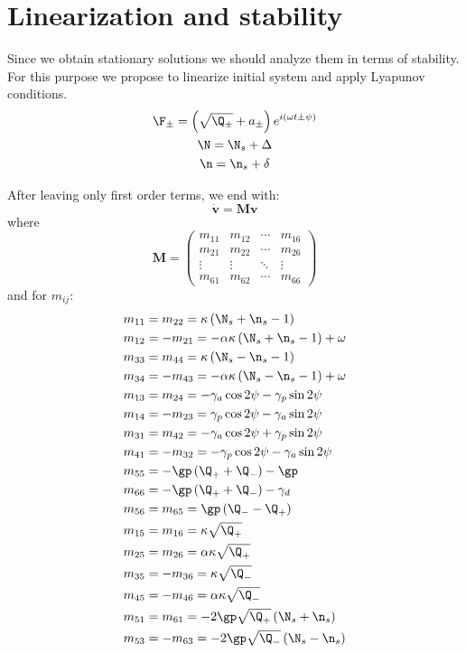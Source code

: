 \documentclass[12pt, notitlepage]{report}
\begin{document}
\section{Linearization and stability}
Since we obtain stationary solutions we should analyze them in terms of stability. For this purpose we propose to linearize initial system and apply Lyapunov conditions. 
\begin{gather}
	\F_\pm = \left(\sqrt{\Q_\pm}+a_\pm\right)e^{i(\omega t \pm \psi)} \\
	\N = \N_s + \Delta \\
	\n = \n_s + \delta
\end{gather}

After leaving only first order terms, we end with:
\newcommand{\bv}{\boldsymbol{v}}
\newcommand{\bM}{\boldsymbol{M}}
\begin{equation}
	\dot{\bv} = \bM\bv
\end{equation}
where
\begin{equation}
	\bM = \begin{pmatrix}
		m_{11} & m_{12} & \cdots & m_{16} \\
		m_{21} & m_{22} & \cdots &m_{26}\\
		\vdots & \vdots & \ddots & \vdots\\
		m_{61} & m_{62} & \cdots&  m_{66} 
	\end{pmatrix}
\end{equation}
and for $m_{ij}$:
\begin{align}
	m_{11} &= m_{22} = \kappa \left(\N_s + \n_s - 1\right)\\
	m_{12} &= -m_{21} = -\alpha\kappa\left(\N_s+\n_s-1\right) + \omega\\
	m_{33} &= m_{44} = \kappa \left(\N_s - \n_s - 1\right) \\
	m_{34} &= -m_{43} = - \alpha\kappa \left(\N_s - \n_s - 1\right) + \omega \\
	m_{13} &= m_{24} = -\gamma_a\cos2\psi - \gamma_p\sin2\psi \\
	m_{14} &= -m_{23} =  \gamma_p\cos2\psi - \gamma_a\sin2\psi \\
	m_{31} &= m_{42} =  -\gamma_a\cos2\psi + \gamma_p\sin2\psi \\
	m_{41} &= -m_{32} =  -\gamma_p\cos2\psi - \gamma_a\sin2\psi \\
	m_{55} &= -\gp\left(\Q_+ + \Q_- \right) - \gp\\
	m_{66} &= - \gp\left(\Q_+ + \Q_-\right) -\gamma_d \\
	m_{56} &= m_{65} = \gp\left(\Q_- - \Q_+\right)	\\
	m_{15} &= m_{16} = \kappa\sqrt{\Q_+}\\
	m_{25} &= m_{26} = \alpha\kappa\sqrt{\Q_+}\\
	m_{35} &= -m_{36} = \kappa\sqrt{\Q_-}\\
	m_{45} &= -m_{46} = \alpha\kappa\sqrt{\Q_-}\\
	m_{51} &= m_{61} = -2\gp\sqrt{\Q_+}\left(\N_s + \n_s\right) \\
	m_{53} &= -m_{63} = -2\gp\sqrt{\Q_-}\left(\N_s - \n_s\right) \\
\end{align}
\end{document}
